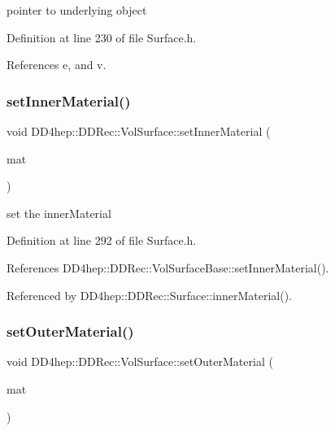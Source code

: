 pointer to underlying object 



Definition at line 230 of file Surface.\+h.



References e, and v.

\hypertarget{class_d_d4hep_1_1_d_d_rec_1_1_vol_surface_a17eba889b8f154c12db6c82dd6769845}{}\label{class_d_d4hep_1_1_d_d_rec_1_1_vol_surface_a17eba889b8f154c12db6c82dd6769845} 
\subsubsection{\texorpdfstring{set\+Inner\+Material()}{setInnerMaterial()}}
{\footnotesize\ttfamily void D\+D4hep\+::\+D\+D\+Rec\+::\+Vol\+Surface\+::set\+Inner\+Material (\begin{DoxyParamCaption}\item[{const \hyperlink{class_d_d_surfaces_1_1_i_material}{I\+Material} \&}]{mat }\end{DoxyParamCaption})\hspace{0.3cm}{\ttfamily [inline]}}



set the inner\+Material 



Definition at line 292 of file Surface.\+h.



References D\+D4hep\+::\+D\+D\+Rec\+::\+Vol\+Surface\+Base\+::set\+Inner\+Material().



Referenced by D\+D4hep\+::\+D\+D\+Rec\+::\+Surface\+::inner\+Material().

\hypertarget{class_d_d4hep_1_1_d_d_rec_1_1_vol_surface_af6a4ee6256e72d0b10e7ebfb54fc28da}{}\label{class_d_d4hep_1_1_d_d_rec_1_1_vol_surface_af6a4ee6256e72d0b10e7ebfb54fc28da} 
\subsubsection{\texorpdfstring{set\+Outer\+Material()}{setOuterMaterial()}}
{\footnotesize\ttfamily void D\+D4hep\+::\+D\+D\+Rec\+::\+Vol\+Surface\+::set\+Outer\+Material (\begin{DoxyParamCaption}\item[{const \hyperlink{class_d_d_surfaces_1_1_i_material}{I\+Material} \&}]{mat }\end{DoxyParamCaption})\hspace{0.3cm}{\ttfamily [inline]}}



